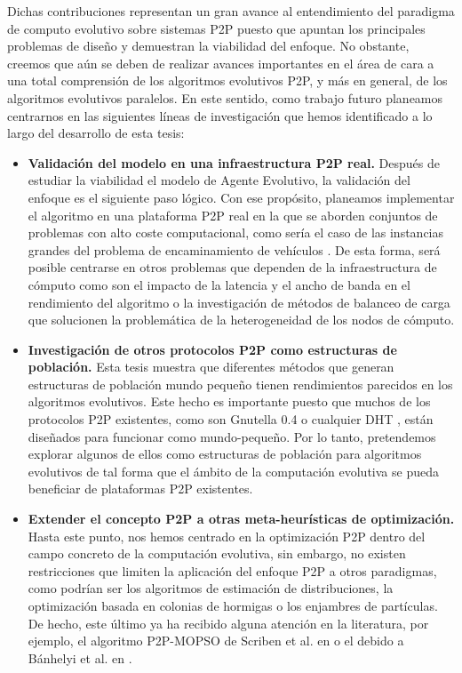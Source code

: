 Dichas contribuciones representan un gran avance al entendimiento del paradigma de computo evolutivo sobre sistemas P2P puesto que apuntan los principales problemas de dise\~no y demuestran la viabilidad del enfoque. No obstante, creemos que a\'un se deben de realizar avances importantes en el \'area de cara a una total comprensi\'on de los algoritmos evolutivos P2P, y m\'as en general, de los algoritmos evolutivos paralelos. En este sentido, como trabajo futuro planeamos centrarnos en las siguientes l\'ineas de investigaci\'on que hemos identificado a lo largo del desarrollo de esta tesis:

\begin{itemize}
\item[] {\bf Validaci\'on del modelo en una infraestructura P2P real.}
Despu\'es de estudiar la viabilidad el modelo de Agente Evolutivo, la validaci\'on del enfoque es el siguiente paso l\'ogico. Con ese prop\'osito, planeamos implementar el algoritmo en una plataforma P2P real en la que se aborden conjuntos de problemas con alto coste computacional, como ser\'ia el caso de las instancias grandes del problema de encaminamiento de veh\'iculos \cite{vlvrp}. De esta forma, ser\'a posible centrarse en otros problemas que dependen de la infraestructura de c\'omputo como son el impacto de la latencia y el ancho de banda en el rendimiento del algoritmo o la investigaci\'on de m\'etodos de balanceo de carga que solucionen la problem\'atica de la heterogeneidad de los nodos de c\'omputo.


\item[] {\bf Investigaci\'on de otros protocolos P2P como estructuras de poblaci\'on.}
Esta tesis muestra que diferentes m\'etodos que generan estructuras de poblaci\'on mundo peque\~no tienen rendimientos parecidos en los algoritmos evolutivos. Este hecho es importante puesto que muchos de los protocolos P2P existentes, como son Gnutella 0.4 \cite{gnutella04} o cualquier DHT \cite{chord,pastry,tapestry,can}, est\'an dise\~nados para funcionar como mundo-peque\~no. Por lo tanto, pretendemos explorar algunos de ellos como estructuras de poblaci\'on para algoritmos evolutivos de tal forma que el \'ambito de la computaci\'on evolutiva se pueda beneficiar de plataformas P2P existentes.


\item[]{\bf Extender el concepto P2P a otras meta-heur\'isticas de optimizaci\'on.}
Hasta este punto, nos hemos centrado en la optimizaci\'on P2P dentro del campo concreto de la computaci\'on evolutiva, sin embargo, no existen restricciones que limiten la aplicaci\'on del enfoque P2P a otros paradigmas, como podr\'ian ser los algoritmos de estimaci\'on de distribuciones, la optimizaci\'on basada en colonias de hormigas o los enjambres de part\'iculas. De hecho, este \'ultimo ya ha recibido alguna atenci\'on en la literatura, por ejemplo, el algoritmo P2P-MOPSO de Scriben et al. en \cite{scriven:p2ppso} o el debido a B\'anhelyi et al. en \cite{balazs:evo09}.


\end{itemize}

